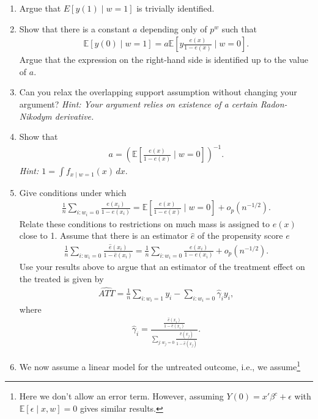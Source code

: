 \documentclass[a4paper]{scrartcl}
\newcommand{\E}{\mathbb{E}}
\begin{document}
\begin{enumerate}
	\item Argue that $E[y(1) \mid w = 1]$ is trivially identified.
	\item Show that there is a constant $a$ depending only of $p^w$ such that 
	\begin{align*}
		\E \left[y(0) \mid w = 1\right] = a \E \left[y \frac{e(x)}{1 - e(x)}\mid w =0 \right].
	\end{align*}
	Argue that the expression on the right-hand side is identified up to the value of $a$.
	\item 
	Can you relax the overlapping support assumption without changing your argument? \emph{Hint: Your argument relies on existence of a certain Radon-Nikodym derivative.}
	\item 
	Show that 
	\begin{align*}
		a = \left(\E \left[ \frac{e(x)}{1 - e(x)} \mid w = 0 \right]\right)^{-1}. 
	\end{align*}
	\emph{Hint: $1 = \int f_{x \mid w = 1} (x) \, dx$}. 
	\item Give conditions under which 
	\begin{align*}
		\frac{1}{n} \sum_{i: w_i = 0} \frac{e(x_i)}{1 - e(x_i)} 
		= \E \left[\frac{e(x)}{1 - e(x)} \mid w = 0 \right] + o_p\left( n^{-1/2} \right). 
	\end{align*}
	Relate these conditions to restrictions on much mass is assigned to $e(x)$ close to 1.
	Assume that there is an estimator $\hat{e}$ of the propensity score $e$
	\begin{align*}
		\frac{1}{n} \sum_{i: w_i = 0} \frac{\hat{e}(x_i)}{1 - \hat{e}(x_i)} 
		= \frac{1}{n} \sum_{i: w_i = 0} \frac{e(x_i)}{1 - e(x_i)} 
		+ o_p\left( n^{-1/2} \right).
	\end{align*}
	Use your results above to argue that an estimator of the treatment effect on the treated is given by 
	\begin{align*}
		\widehat{ATT} = \frac{1}{n} \sum_{i : w_i = 1} y_i 
		- \sum_{i: w_i = 0} \hat{\gamma}_i y_i, 
	\end{align*}
	where 
	\begin{align*}
		\hat{\gamma}_i = \frac{\frac{\hat{e}(x_i)}{1 - \hat{e}(x_i)}}{\sum_{j: w_j = 0} \frac{\hat{e}(x_j)}{1 - \hat{e}(x_j)}}.
	\end{align*}
	\item 
	We now assume a linear model for the untreated outcome, i.e., we assume\footnote{%
	Here we don't allow an error term. However, assuming $Y(0) = x'\beta^{c} + \epsilon$ with $\E[\epsilon \mid x, w] = 0$ gives similar results.
}
\end{enumerate}
\end{document}
